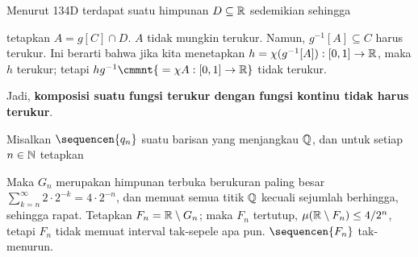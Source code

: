  Menurut 134D terdapat suatu himpunan
$D\subseteq\Bbb R$ sedemikian sehingga


\noindent tetapkan $A=g[C]\cap D$.  $A$ tidak mungkin
terukur.
Namun, $g^{-1}[A]\subseteq C$ harus terukur.
Ini berarti bahwa jika kita menetapkan
$h=\chi(g^{-1}[A]):[0,1]\to\Bbb R$, maka $h$ terukur; tetapi
$hg^{-1}\cmmnt{\mskip5mu =\chi A:[0,1]\to\Bbb R}$ tidak terukur.

Jadi, {\bf komposisi suatu fungsi terukur dengan fungsi kontinu tidak harus
terukur}. 

 Misalkan $\sequencen{q_n}$ suatu barisan
yang menjangkau $\Bbb Q$, dan untuk setiap $n\in\Bbb N$ tetapkan



\noindent Maka $G_n$ merupakan himpunan terbuka berukuran paling besar
$\sum_{k=n}^{\infty}2\cdot 2^{-k}=4\cdot 2^{-n}$, dan memuat semua titik
$\Bbb Q$ kecuali sejumlah berhingga, sehingga rapat. Tetapkan $F_n=\Bbb R\setminus G_n$;
maka $F_n$ tertutup, $\mu(\Bbb R\setminus F_n)\le 4/2^n$, tetapi $F_n$
tidak memuat interval tak-sepele apa pun.
$\sequencen{F_n}$ tak-menurun.

